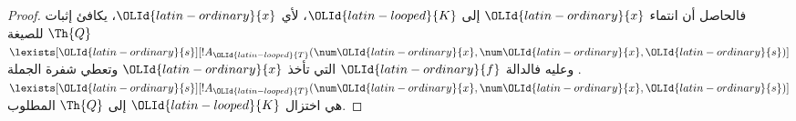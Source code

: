 \documentclass[../../../include/open-logic-section]{subfiles}
\begin{document}
\begin{proof}
فالحاصل أن انتماء $\OLId{latin-ordinary}{x}$ إلى $\OLId{latin-looped}{K}$، لأي $\OLId{latin-ordinary}{x}$، يكافئ إثبات
$\Th{Q}$ للصيغة $\lexists[\OLId{latin-ordinary}{s}][!A_\OLId{latin-looped}{T}(\num \OLId{latin-ordinary}{x},\num \OLId{latin-ordinary}{x},\OLId{latin-ordinary}{s})]$.
وعليه فالدالة $\OLId{latin-ordinary}{f}$ التي تأخذ $\OLId{latin-ordinary}{x}$ وتعطي شفرة الجملة
$\lexists[\OLId{latin-ordinary}{s}][!A_\OLId{latin-looped}{T}(\num \OLId{latin-ordinary}{x},\num \OLId{latin-ordinary}{x},\OLId{latin-ordinary}{s})]$ هي اختزال $\OLId{latin-looped}{K}$ إلى
$\Th{Q}$ المطلوب.
\end{proof}
\end{document}
